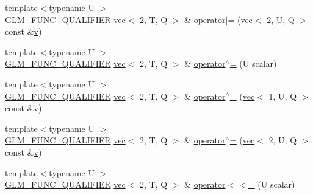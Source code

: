 \begin{DoxyCompactItemize}
\item 
{\footnotesize template$<$typename U $>$ }\\\mbox{\hyperlink{setup_8hpp_a33fdea6f91c5f834105f7415e2a64407}{G\+L\+M\+\_\+\+F\+U\+N\+C\+\_\+\+Q\+U\+A\+L\+I\+F\+I\+ER}} \mbox{\hyperlink{structglm_1_1vec}{vec}}$<$ 2, T, Q $>$ \& \mbox{\hyperlink{structglm_1_1vec_3_012_00_01_t_00_01_q_01_4_a7c1e10ca06c86243f4ad6ceb094e7bdc}{operator$\vert$=}} (\mbox{\hyperlink{structglm_1_1vec}{vec}}$<$ 2, U, Q $>$ const \&\mbox{\hyperlink{_s_d_l__opengl_8h_a10a82eabcb59d2fcd74acee063775f90}{v}})
\item 
{\footnotesize template$<$typename U $>$ }\\\mbox{\hyperlink{setup_8hpp_a33fdea6f91c5f834105f7415e2a64407}{G\+L\+M\+\_\+\+F\+U\+N\+C\+\_\+\+Q\+U\+A\+L\+I\+F\+I\+ER}} \mbox{\hyperlink{structglm_1_1vec}{vec}}$<$ 2, T, Q $>$ \& \mbox{\hyperlink{structglm_1_1vec_3_012_00_01_t_00_01_q_01_4_a001454ab3038753bcf6550210eee8e59}{operator$^\wedge$=}} (U scalar)
\item 
{\footnotesize template$<$typename U $>$ }\\\mbox{\hyperlink{setup_8hpp_a33fdea6f91c5f834105f7415e2a64407}{G\+L\+M\+\_\+\+F\+U\+N\+C\+\_\+\+Q\+U\+A\+L\+I\+F\+I\+ER}} \mbox{\hyperlink{structglm_1_1vec}{vec}}$<$ 2, T, Q $>$ \& \mbox{\hyperlink{structglm_1_1vec_3_012_00_01_t_00_01_q_01_4_a430b0e95cce94009cb9822a7b8a08f89}{operator$^\wedge$=}} (\mbox{\hyperlink{structglm_1_1vec}{vec}}$<$ 1, U, Q $>$ const \&\mbox{\hyperlink{_s_d_l__opengl_8h_a10a82eabcb59d2fcd74acee063775f90}{v}})
\item 
{\footnotesize template$<$typename U $>$ }\\\mbox{\hyperlink{setup_8hpp_a33fdea6f91c5f834105f7415e2a64407}{G\+L\+M\+\_\+\+F\+U\+N\+C\+\_\+\+Q\+U\+A\+L\+I\+F\+I\+ER}} \mbox{\hyperlink{structglm_1_1vec}{vec}}$<$ 2, T, Q $>$ \& \mbox{\hyperlink{structglm_1_1vec_3_012_00_01_t_00_01_q_01_4_afed5270119c717c84024b98edb08e265}{operator$^\wedge$=}} (\mbox{\hyperlink{structglm_1_1vec}{vec}}$<$ 2, U, Q $>$ const \&\mbox{\hyperlink{_s_d_l__opengl_8h_a10a82eabcb59d2fcd74acee063775f90}{v}})
\item 
{\footnotesize template$<$typename U $>$ }\\\mbox{\hyperlink{setup_8hpp_a33fdea6f91c5f834105f7415e2a64407}{G\+L\+M\+\_\+\+F\+U\+N\+C\+\_\+\+Q\+U\+A\+L\+I\+F\+I\+ER}} \mbox{\hyperlink{structglm_1_1vec}{vec}}$<$ 2, T, Q $>$ \& \mbox{\hyperlink{structglm_1_1vec_3_012_00_01_t_00_01_q_01_4_ace47fc51a0a40c12d24193c4ff6ac8ae}{operator$<$$<$=}} (U scalar)
\item 

\end{DoxyCompactItemize}
